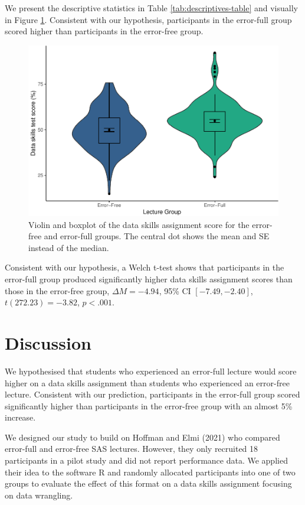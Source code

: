 \documentclass[
  man,floatsintext]{apa6}
\begin{document}
We present the descriptive statistics in Table \ref{tab:descriptives-table} and visually in Figure \ref{fig:violin-plot}. Consistent with our hypothesis, participants in the error-full group scored higher than participants in the error-free group.



\begin{figure}
\includegraphics[width=1\linewidth]{Erroneous_code_manuscript_files/figure-latex/violin-plot-1} \caption{Violin and boxplot of the data skills assignment score for the error-free and error-full groups. The central dot shows the mean and SE instead of the median.}\label{fig:violin-plot}
\end{figure}

Consistent with our hypothesis, a Welch t-test shows that participants in the error-full group produced significantly higher data skills assignment scores than those in the error-free group, \(\Delta M = -4.94\), 95\% CI \([-7.49, -2.40]\), \(t(272.23) = -3.82\), \(p < .001\).

\hypertarget{discussion}{%
\section{Discussion}\label{discussion}}

We hypothesised that students who experienced an error-full lecture would score higher on a data skills assignment than students who experienced an error-free lecture. Consistent with our prediction, participants in the error-full group scored significantly higher than participants in the error-free group with an almost 5\% increase.

We designed our study to build on Hoffman and Elmi (2021) who compared error-full and error-free SAS lectures. However, they only recruited 18 participants in a pilot study and did not report performance data. We applied their idea to the software R and randomly allocated participants into one of two groups to evaluate the effect of this format on a data skills assignment focusing on data wrangling.
\end{document}
